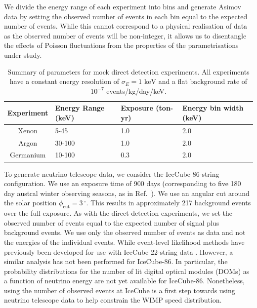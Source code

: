 
We divide the energy range of each experiment into bins and generate Asimov data \cite{Cowan:2013} by setting the observed number of events in each bin equal to the expected number of events. While this cannot correspond to a physical realisation of data as the observed number of events will be non-integer, it allows us to disentangle the effects of Poisson fluctuations from the properties of the parametrisations under study.

\begin{table}[t]
  \setlength{\extrarowheight}{3pt}
  \begin{center}
	\begin{tabular}{cm{2.75cm}m{2.5cm}m{2.75cm}}
        \hline\hline
	Experiment & Energy Range (keV) & Exposure (ton-yr) & Energy bin width (keV) \\
        \hline
	Xenon &  5-45 & 1.0 & 2.0 \\
	Argon &  30-100 & 1.0 & 2.0 \\
	Germanium  & 10-100 & 0.3 & 2.0 \\
        \hline\hline
	\end{tabular}
  \end{center}
\label{tab:NT:Experiments}
\caption[Summary of parameters for mock direct detection experiments used in Chapter~\ref{ch:NT}]{Summary of parameters for mock direct detection experiments. All experiments have a constant energy resolution of $\sigma_E = 1 \textrm{ keV}$ and a flat background rate of $10^{-7}$ events/kg/day/keV. }
\end{table}

To generate neutrino telescope data, we consider the IceCube 86-string configuration. We use an exposure time of 900 days (corresponding to five 180 day austral winter observing seasons, as in Ref.~\cite{Arina:2013}). We use an angular cut around the solar position $\phi_\textrm{cut} = 3\,^{\circ}$. This results in approximately 217 background events over the full exposure. As with the direct detection experiments, we set the observed number of events equal to the expected number of signal plus background events. We use only the observed number of events as data and not the energies of the individual events. While event-level likelihood methods have previously been developed \cite{Scott:2012} for use with IceCube 22-string data \cite{Abbasi:2009}. However, a similar analysis has not been performed for IceCube-86. In particular, the probability distributions for the number of lit digital optical modules (DOMs) as a function of neutrino energy are not yet available for IceCube-86. Nonetheless, using the number of observed events at IceCube is a first step towards using neutrino telescope data to help constrain the WIMP speed distribution.

